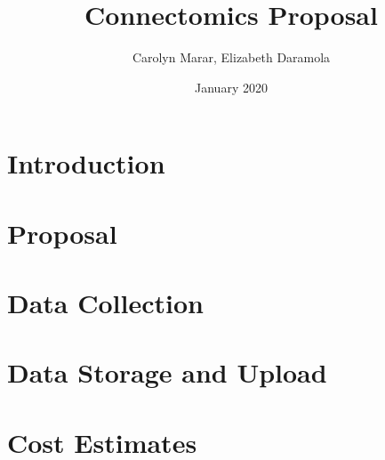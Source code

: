 \documentclass{article}
\title{Connectomics Proposal}
\author{Carolyn Marar, Elizabeth Daramola }
\date{January 2020}
\begin{document}
\maketitle

\section{Introduction}

\section{Proposal}

\section{Data Collection}

\section{Data Storage and Upload}

\section{Cost Estimates}
\end{document}
